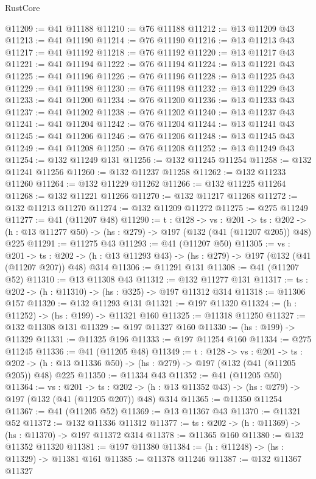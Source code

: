 \begin{lexlean}{RustCore}
\begin{coremodule}
@11209 := @41 @11188
@11210 := @76 @11188
@11212 := @13 @11209 @43
@11213 := @41 @11190
@11214 := @76 @11190
@11216 := @13 @11213 @43
@11217 := @41 @11192
@11218 := @76 @11192
@11220 := @13 @11217 @43
@11221 := @41 @11194
@11222 := @76 @11194
@11224 := @13 @11221 @43
@11225 := @41 @11196
@11226 := @76 @11196
@11228 := @13 @11225 @43
@11229 := @41 @11198
@11230 := @76 @11198
@11232 := @13 @11229 @43
@11233 := @41 @11200
@11234 := @76 @11200
@11236 := @13 @11233 @43
@11237 := @41 @11202
@11238 := @76 @11202
@11240 := @13 @11237 @43
@11241 := @41 @11204
@11242 := @76 @11204
@11244 := @13 @11241 @43
@11245 := @41 @11206
@11246 := @76 @11206
@11248 := @13 @11245 @43
@11249 := @41 @11208
@11250 := @76 @11208
@11252 := @13 @11249 @43
@11254 := @132 @11249 @131
@11256 := @132 @11245 @11254
@11258 := @132 @11241 @11256
@11260 := @132 @11237 @11258
@11262 := @132 @11233 @11260
@11264 := @132 @11229 @11262
@11266 := @132 @11225 @11264
@11268 := @132 @11221 @11266
@11270 := @132 @11217 @11268
@11272 := @132 @11213 @11270
@11274 := @132 @11209 @11272
@11275 := @275 @11249
@11277 := @41 (@11207 @48)
@11290 := {t : @128} ->
  {vs : @201} ->
  {ts : @202} -> (h : @13 @11277 @50) -> (hs : @279) -> @197 (@132 (@41 (@11207 @205)) @48) @225
@11291 := @11275 @43
@11293 := @41 (@11207 @50)
@11305 := {vs : @201} ->
  {ts : @202} -> (h : @13 @11293 @43) -> (hs : @279) -> @197 (@132 (@41 (@11207 @207)) @48) @314
@11306 := @11291 @131
@11308 := @41 (@11207 @52)
@11310 := @13 @11308 @43
@11312 := @132 @11277 @131
@11317 := {ts : @202} -> (h : @11310) -> (hs : @325) -> @197 @11312 @314
@11318 := @11306 @157
@11320 := @132 @11293 @131
@11321 := @197 @11320
@11324 := (h : @11252) -> (hs : @199) -> @11321 @160
@11325 := @11318 @11250
@11327 := @132 @11308 @131
@11329 := @197 @11327 @160
@11330 := (hs : @199) -> @11329
@11331 := @11325 @196
@11333 := @197 @11254 @160
@11334 := @275 @11245
@11336 := @41 (@11205 @48)
@11349 := {t : @128} ->
  {vs : @201} ->
  {ts : @202} -> (h : @13 @11336 @50) -> (hs : @279) -> @197 (@132 (@41 (@11205 @205)) @48) @225
@11350 := @11334 @43
@11352 := @41 (@11205 @50)
@11364 := {vs : @201} ->
  {ts : @202} -> (h : @13 @11352 @43) -> (hs : @279) -> @197 (@132 (@41 (@11205 @207)) @48) @314
@11365 := @11350 @11254
@11367 := @41 (@11205 @52)
@11369 := @13 @11367 @43
@11370 := @11321 @52
@11372 := @132 @11336 @11312
@11377 := {ts : @202} -> (h : @11369) -> (hs : @11370) -> @197 @11372 @314
@11378 := @11365 @160
@11380 := @132 @11352 @11320
@11381 := @197 @11380
@11384 := (h : @11248) -> (hs : @11329) -> @11381 @161
@11385 := @11378 @11246
@11387 := @132 @11367 @11327

\end{coremodule}
\end{lexlean}
